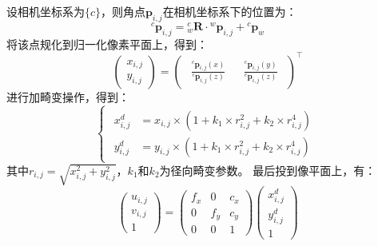 \documentclass[12pt, onecolumn]{article}
\begin{document}
	设相机坐标系为$\{c\}$，则角点${\boldsymbol{p}_{i,j}}$在相机坐标系下的位置为：
	\begin{equation}
	{^c\boldsymbol{p}_{i,j}}={^{c}_{w}\boldsymbol{R}}\cdot{^w\boldsymbol{p}_{i,j}}+{^c\boldsymbol{p}_{w}}
	\end{equation}
	将该点规化到归一化像素平面上，得到：
	\begin{equation}
	\begin{pmatrix}
	x_{i,j}\\y_{i,j}
	\end{pmatrix}=\begin{pmatrix}
	\begin{aligned}
	\frac{{^c\boldsymbol{p}_{i,j}}(x)}{{^c\boldsymbol{p}_{i,j}}(z)}
	\end{aligned}
	&
	\begin{aligned}		\frac{{^c\boldsymbol{p}_{i,j}}(y)}{{^c\boldsymbol{p}_{i,j}}(z)}
	\end{aligned}
	\end{pmatrix}^\top
	\end{equation}
	进行加畸变操作，得到：
	\begin{equation}
	\begin{cases}
	\begin{aligned}
	x_{i,j}^d&=x_{i,j}\times\left( 1+k_1\times r_{i,j}^2+k_2\times r_{i,j}^4\right) 
	\\
	y_{i,j}^d&=y_{i,j}\times\left( 1+k_1\times r_{i,j}^2+k_2\times r_{i,j}^4\right) 
	\end{aligned}
	\end{cases}
	\end{equation}
	其中$r_{i,j}=\sqrt{x_{i,j}^2+y_{i,j}^2}$，$k_1$和$k_2$为径向畸变参数。
	最后投到像平面上，有：
	\begin{equation}
	\begin{pmatrix}
	u_{i,j}\\v_{i,j}\\1
	\end{pmatrix}=
	\begin{pmatrix}
	f_x&0&c_x\\
	0&f_y&c_y\\
	0&0&1
	\end{pmatrix}
	\begin{pmatrix}
		x_{i,j}^d\\y_{i,j}^d\\1
	\end{pmatrix}
	\end{equation}
	
\end{document}
